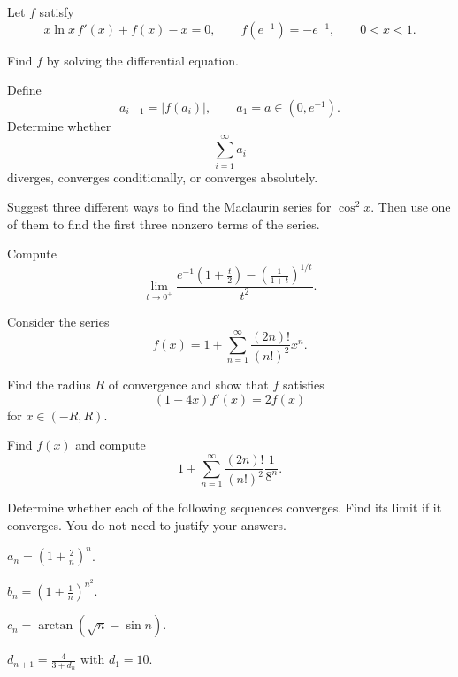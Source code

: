 \begin{problem}
Let $f$ satisfy
\[
x\ln x\,f'(x)+f(x)-x=0,
\qquad
f(e^{-1})=-e^{-1},
\qquad
0<x<1.
\]
\begin{problemsubparts}
\item Find $f$ by solving the differential equation.
\item Define
\[
a_{i+1}=|f(a_i)|,
\qquad
a_1=a\in(0,e^{-1}).
\]
Determine whether
\[
\sum_{i=1}^{\infty}a_i
\]
diverges, converges conditionally, or converges absolutely.
\end{problemsubparts}
\end{problem}
\begin{problem}
\begin{problemsubparts}
\item Suggest three different ways to find the Maclaurin series for $\cos^2 x$. Then use one of them to find the first three nonzero terms of the series.
\item Compute
\[
\lim_{t\to0^+}
\frac{
 e^{-1}\left(1+\frac{t}{2}\right)
 -\left(\frac{1}{1+t}\right)^{1/t}
}{t^2}.
\]
\end{problemsubparts}
\end{problem}
\begin{problem}
Consider the series
\[
f(x)=1+\sum_{n=1}^{\infty}\frac{(2n)!}{(n!)^2}x^n.
\]
\begin{problemsubparts}
\item Find the radius $R$ of convergence and show that $f$ satisfies
\[
(1-4x)f'(x)=2f(x)
\]
for $x\in(-R,R)$.
\item Find $f(x)$ and compute
\[
1+\sum_{n=1}^{\infty}\frac{(2n)!}{(n!)^2}\frac{1}{8^n}.
\]
\end{problemsubparts}
\end{problem}
\begin{problem}
Determine whether each of the following sequences converges. Find its limit if it converges. You do not need to justify your answers.
\begin{problemsubparts}
\item $\displaystyle a_n=\left(1+\frac{2}{n}\right)^n$.
\item $\displaystyle b_n=\left(1+\frac{1}{n}\right)^{n^2}$.
\item $\displaystyle c_n=\arctan(\sqrt n-\sin n)$.
\item $\displaystyle d_{n+1}=\frac{4}{3+d_n}$ with $d_1=10$.
\end{problemsubparts}
\end{problem}
